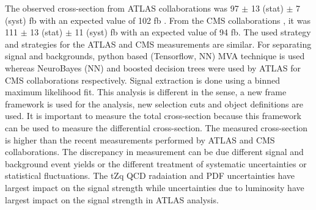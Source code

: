 The observed cross-section from ATLAS collaborations \cite{tZq2020} was  97 $\pm$ 13 (stat) $\pm$ 7 (syst) fb with an expected value of 102 fb . From the CMS collaborations  \cite{tonon2017measurement}, it was 111 $\pm$ 13 (stat) $\pm$ 11 (syst) fb with an expected value of 94 fb. The used strategy and strategies for the ATLAS and CMS measurements are similar. For separating signal and backgrounds, python based (Tensorflow, NN) MVA technique is used whereas NeuroBayes (NN) and boosted decision trees were used by ATLAS for CMS collaborations respectively. Signal extraction is done using a binned maximum likelihood fit. This analysis is different in the sense, a new frame framework is used for the analysis, new selection cuts and object definitions are used. It is important to measure the total cross-section because this framework can be used to measure the differential cross-section. The measured cross-section is higher than the recent measurements performed by ATLAS and CMS collaborations. The discrepancy in measurement can be due different signal and background event yields or the different treatment of systematic uncertainties or statistical fluctuations. The tZq QCD radaiation and PDF uncertainties have largest impact on the signal strength while uncertainties due to luminosity have largest impact on the signal strength in ATLAS analysis\cite{tZq2020}. 
